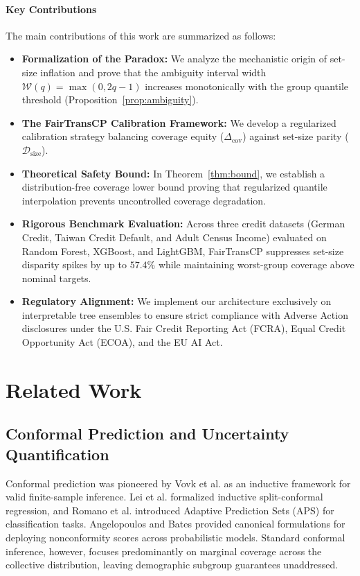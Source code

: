 \documentclass[conference]{IEEEtran}
\begin{document}
\paragraph{Key Contributions}
The main contributions of this work are summarized as follows:
\begin{itemize}
    \item \textbf{Formalization of the Paradox:} We analyze the mechanistic origin of set-size inflation and prove that the ambiguity interval width $\mathcal{W}(q) = \max(0, 2q - 1)$ increases monotonically with the group quantile threshold (Proposition~\ref{prop:ambiguity}).
    \item \textbf{The FairTransCP Calibration Framework:} We develop a regularized calibration strategy balancing coverage equity ($\Delta_{\text{cov}}$) against set-size parity ($\mathcal{D}_{\text{size}}$).
    \item \textbf{Theoretical Safety Bound:} In Theorem~\ref{thm:bound}, we establish a distribution-free coverage lower bound proving that regularized quantile interpolation prevents uncontrolled coverage degradation.
    \item \textbf{Rigorous Benchmark Evaluation:} Across three credit datasets (German Credit, Taiwan Credit Default, and Adult Census Income) evaluated on Random Forest, XGBoost, and LightGBM, FairTransCP suppresses set-size disparity spikes by up to $57.4\%$ while maintaining worst-group coverage above nominal targets.
    \item \textbf{Regulatory Alignment:} We implement our architecture exclusively on interpretable tree ensembles to ensure strict compliance with Adverse Action disclosures under the U.S. Fair Credit Reporting Act (FCRA), Equal Credit Opportunity Act (ECOA), and the EU AI Act.
\end{itemize}

\section{Related Work}

\subsection{Conformal Prediction and Uncertainty Quantification}
Conformal prediction was pioneered by Vovk et al. \cite{vovk2005algorithmic} as an inductive framework for valid finite-sample inference. Lei et al. \cite{lei2018distribution} formalized inductive split-conformal regression, and Romano et al. \cite{romano2020classification} introduced Adaptive Prediction Sets (APS) for classification tasks. Angelopoulos and Bates \cite{angelopoulos2021gentle} provided canonical formulations for deploying nonconformity scores across probabilistic models. Standard conformal inference, however, focuses predominantly on marginal coverage across the collective distribution, leaving demographic subgroup guarantees unaddressed.
\end{document}
